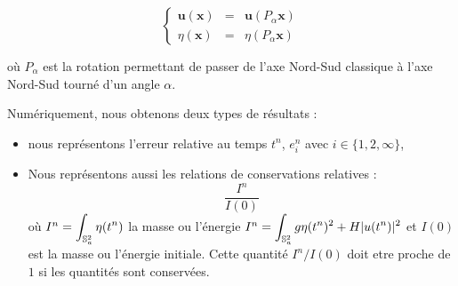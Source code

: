\begin{equation}
\left\lbrace
\begin{array}{rcl}
\mathbf{u}(\mathbf{x}) & = & \mathbf{u}(P_{\alpha} \mathbf{x} ) \\
\eta (\mathbf{x}) & = & \eta(P_{\alpha} \mathbf{x} )
\end{array}
\right.
\end{equation}

où $P_{\alpha}$ est la rotation permettant de passer de l'axe Nord-Sud classique à l'axe Nord-Sud tourné d'un angle $\alpha$.

Numériquement, nous obtenons deux types de résultats :
\begin{itemize}
\item nous représentons l'erreur relative au temps $t^n$, $e_i^n$ avec $i \in \lbrace 1, 2, \infty \rbrace$,
\item Nous représentons aussi les relations de conservations relatives :
\begin{equation}
\dfrac{I^n}{I(0)}
\end{equation}
où  $I^n = \displaystyle\int_{\mathbb{S}_a^2} \eta (t^n)$ la masse ou l'énergie $I^n = \displaystyle\int_{\mathbb{S}_a^2} g \eta (t^n)^2 + H |u(t^n) |^2$ et $I(0)$ est la masse ou l'énergie initiale. Cette quantité $I^n/I(0)$ doit etre proche de $1$ si les quantités sont conservées.
\end{itemize} 


